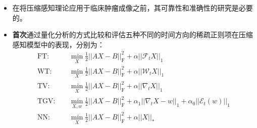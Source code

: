 \documentclass{beamer}
\begin{document}
\begin{frame}
	\begin{itemize}
		\item 在将压缩感知理论应用于临床肿瘤成像之前，其可靠性和准确性的研究是必要的。
		\item \textbf{首次}通过量化分析的方式比较和评估五种不同的时间方向的稀疏正则项在压缩感知模型中的表现，分别为：
		\begin{equation}
		\begin{aligned}
	 \mathrm{FT}:\quad &\min_X\frac{1}{2}||AX-B||_{\mathrm{F}}^2 + \alpha||\mathcal{F}_tX||_1 \\
	 \mathrm{WT}:\quad &\min_X\frac{1}{2}||AX-B||_{\mathrm{F}}^2 + \alpha||\mathcal{W}_tX||_1 \\
	 \mathrm{TV}:\quad &\min_X\frac{1}{2}||AX-B||_{\mathrm{F}}^2 + \alpha||\nabla_t X||_1 \\
	 \mathrm{TGV}:\quad &\min_{X,w}\frac{1}{2}||AX-B||_{\mathrm{F}}^2 + \alpha_1||\nabla_t X-w||_1 +\alpha_0||\mathcal{E}_t(w)||_1\\
	 \mathrm{NN}:\quad &\min_X\frac{1}{2}||AX-B||_{\mathrm{F}}^2 + \alpha||X||_*
\end{aligned}
\end{equation}
	\end{itemize}
\end{frame}


\end{document}
